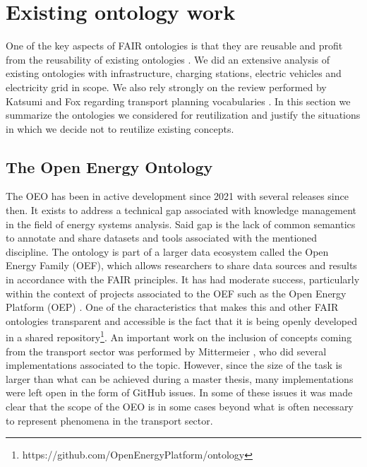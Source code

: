 \section{Existing ontology work}
\label{existingontologies}

One of the key aspects of FAIR ontologies is that they are reusable and profit
from the reusability of existing ontologies \cite{PovedaVillalon.2020}. We did
an extensive analysis of existing ontologies with infrastructure, charging
stations, electric vehicles and electricity grid in scope. We also rely
strongly on the review performed by Katsumi and Fox regarding transport
planning vocabularies \cite{Katsumi.2018}. In this section we summarize the
ontologies we considered for reutilization and justify the situations in which
we decide not to reutilize existing concepts.


\subsection{The Open Energy Ontology}

The OEO has been in active development since 2021 with several releases since
then. It exists to address a technical gap associated with knowledge management
in the field of energy systems analysis. Said gap is the lack of common
semantics to annotate and share datasets and tools associated with the mentioned
discipline. The ontology is part of a larger data ecosystem called the Open
Energy Family (OEF), which allows researchers to share data sources and results
in accordance with the FAIR principles. It has had moderate success,
particularly within the context of projects associated to the OEF such as the
Open Energy Platform (OEP) \cite{Hulk.2024}. One of the characteristics that
makes this and other FAIR ontologies transparent and accessible is the fact that
it is being openly developed in a shared
repository\footnote{https://github.com/OpenEnergyPlatform/ontology}. An
important work on the inclusion of concepts coming from the transport sector was
performed by Mittermeier \cite{Mittermeier.2023}, who did several implementations
associated to the topic. However, since the size of the task is larger than what
can be achieved during a master thesis, many implementations were left open in
the form of GitHub issues. In some of these issues it was made clear that the
scope of the OEO is in some cases beyond what is often necessary to represent
phenomena in the transport sector.



